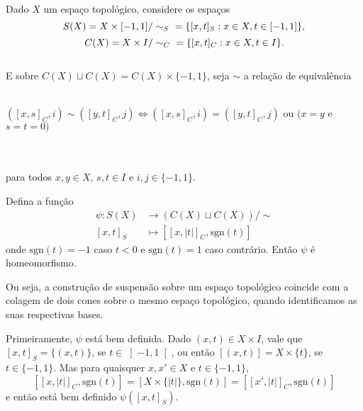 \begin{prop}
	Dado $X$ um espaço topológico, considere os espaços
    \[S(X) = X\times[-1,1]/\sim_S\hspace{6 pt} = \{[x,t]_S : x\in X, t\in [-1,1]\},\]
    \[C(X) = X\times I/\sim_C\hspace{6 pt} = \{[x,t]_C : x\in X, t\in I\}.\]
    \\
    \noindent E sobre $C(X) \sqcup C(X) = C(X)\times\{-1,1\}$, seja $\sim$ a relação de equivalência\\
    \\ \centerline{
    $([x,s]_C,i) \sim ([y,t]_C,j) \Leftrightarrow ([x,s]_C,i) = ([y,t]_C,j)$ ou $(x=y$ e $s=t=0)$}\\
    \\para todos $x,y \in X$, $s,t \in I$ e $i,j \in \{-1,1\}$.    
    
    Defina a função \begin{align*}
        \psi: S(X) &\rightarrow (C(X) \sqcup C(X))/ \sim\\
                [x,t]_S &\mapsto [[x,|t|]_C,\text{sgn}(t)]
    \end{align*}
    onde $\text{sgn}(t) = -1$ caso $t < 0$ e $\text{sgn}(t) = 1$ caso contrário. Então $\psi$ é homeomorfismo.

	Ou seja, a construção de suspensão sobre um espaço topológico coincide com a colagem de dois cones sobre o mesmo espaço topológico, quando identificamos as suas respectivas bases.

    \begin{dem}
        Primeiramente, $\psi$ está bem definida. Dado $(x,t) \in X\times I$, vale que $[x,t]_S = \{(x,t)\}$, se $t \in \left]-1,1\right[$, ou então $[(x,t)] = X\times\{t\}$, se $t \in \{-1,1\}$. Mas para quaisquer $x,x'\in X$ e $t\in \{-1,1\}$,\[
        [[x,|t|]_C,\text{sgn}(t)] =
        [X\times\{|t|\},\text{sgn}(t)] =
        [[x',|t|]_C,\text{sgn}(t)]
        \]
        e então está bem definido $\psi([x,t]_S)$.


\end{dem}
\end{prop}
